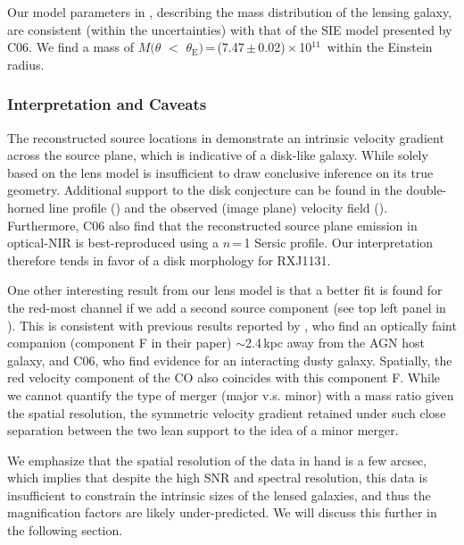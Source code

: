 \documentclass[]{emulateapj}
\begin{document}
Our model parameters in , describing
the mass distribution of the lensing galaxy, are consistent (within the uncertainties)
with that of the SIE model presented by C06. We find a mass of
$M(\theta$\,\,$<$\,\,$\theta_\textrm{E})$\,=\,(7.47\,$\pm$\,0.02)\,$\times$\,10$^{11}$\,\Msun
within the Einstein radius.

\subsubsection{Interpretation and Caveats} \label{sec:caveat} %
The reconstructed source locations in  demonstrate
an intrinsic velocity gradient across the source plane, which is
indicative of a disk-like galaxy. While solely based on the
lens model is insufficient to draw conclusive inference on its
true geometry. Additional support to the disk conjecture %
can be found in the double-horned line profile ()
and the observed (image plane) velocity field (). Furthermore,
C06 also find that the reconstructed source plane emission in optical-NIR
is best-reproduced using a $n$\,=\,1 Sersic profile.
Our interpretation therefore tends in favor of a disk morphology for RXJ1131.

One other interesting result from our lens model is that a better fit is
found for the red-most channel if we add a second source component (see
top left panel in ). This is consistent with previous results
reported by \citet{Brewer08a}, who find an optically faint companion
(component F in their paper) $\sim$2.4\,kpc away from the AGN host galaxy,
and C06, who find evidence for an interacting dusty galaxy.
Spatially, the red velocity component of the CO also coincides with this
component F. While we cannot quantify the type of
merger (major v.s. minor) with a mass ratio given the
spatial resolution, the symmetric velocity gradient retained under
such close separation between the two lean support
to the idea of a minor merger.

We emphasize that the spatial resolution of the data in hand
is a few arcsec, which implies that despite the high SNR and spectral
resolution, this data is insufficient to constrain the
intrinsic sizes of the lensed galaxies, and thus the magnification
factors are likely under-predicted.
We will discuss this further in the following section. %
\end{document}
